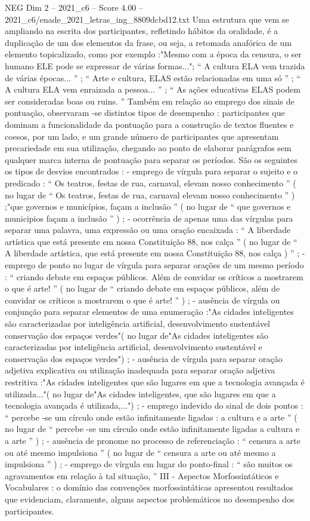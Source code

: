 \begin{textsample}{NEG Dim 2 – 2021\_c6 – Score 4.00 – 2021\_c6/enade\_2021\_letras\_ing\_8809dcbd12.txt}
Uma estrutura que vem se ampliando na escrita dos participantes, refletindo hábitos da oralidade, é a duplicação de um dos elementos da frase, ou seja, a retomada anafórica de um elemento topicalizado, como por exemplo :"Mesmo com a época da censura, o ser humano ELE pode se expressar de várias formas..."; “ A cultura ELA vem trazida de várias épocas... ” ; “ Arte e cultura, ELAS estão relacionadas em uma só ” ; “ A cultura ELA vem enraizada a pessoa... ” ; “ As ações educativas ELAS podem ser consideradas boas ou ruins. ” Também em relação ao emprego dos sinais de pontuação, observaram -se distintos tipos de desempenho : participantes que dominam a funcionalidade da pontuação para a construção de textos fluentes e coesos, por um lado, e um grande número de participantes que apresentam precariedade em sua utilização, chegando ao ponto de elaborar parágrafos sem qualquer marca interna de pontuação para separar os períodos.
São os seguintes os tipos de desvios encontrados : - emprego de vírgula para separar o sujeito e o predicado : “ Os teatros, festas de rua, carnaval, elevam nosso conhecimento ” ( no lugar de “ Os teatros, festas de rua, carnaval elevam nosso conhecimento ” ) ;"que governos e municípios, façam a inclusão ” ( no lugar de “ que governos e municipios façam a inclusão ” ) ; - ocorrência de apenas uma das vírgulas para separar uma palavra, uma expressão ou uma oração encaixada : “ A liberdade artística que está presente em nossa Constituição 88, nos calça ” ( no lugar de “ A liberdade artística, que está presente em nossa Constituição 88, nos calça ) ” ; - emprego de ponto no lugar de vírgula para separar orações de um mesmo período : “ criando debate em espaços públicos.
Além de convidar os críticos a mostrarem o que é arte! ” ( no lugar de “ criando debate em espaços públicos, além de convidar os críticos a mostrarem o que é arte! ” ) ; - ausência de vírgula ou conjunção para separar elementos de uma enumeração :"As cidades inteligentes são caracterizadas por inteligência artificial, desenvolvimento sustentável conservação dos espaços verdes"( no lugar de"As cidades inteligentes são caracterizadas por inteligência artificial, desenvolvimento sustentável e conservação dos espaços verdes") ; - ausência de vírgula para separar oração adjetiva explicativa ou utilização inadequada para separar oração adjetiva restritiva :"As cidades inteligentes que são lugares em que a tecnologia avançada é utilizada..."( no lugar de"As cidades inteligentes, que são lugares em que a tecnologia avançada é utilizada,...") ; - emprego indevido do sinal de dois pontos : “ percebe -se um círculo onde estão infinitamente ligadas : a cultura e a arte ” ( no lugar de “ percebe -se um círculo onde estão infinitamente ligadas a cultura e a arte ” ) ; - ausência de pronome no processo de referenciação : “ censura a arte ou até mesmo impulsiona ” ( no lugar de “ censura a arte ou até mesmo a impulsiona ” ) ; - emprego de vírgula em lugar do ponto-final : “ são muitos os agravamentos em relação à tal situação, ” III - Aspectos Morfossintáticos e Vocabulares : o domínio das convenções morfossintáticas apresentou resultados que evidenciam, claramente, alguns aspectos problemáticos no desempenho dos participantes.

\end{textsample}
